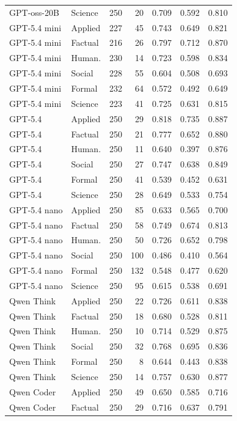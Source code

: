 \begin{longtable}{llrrrrr}
GPT-oss-20B & Science & 250 & 20 & 0.709 & 0.592 & 0.810 \\
GPT-5.4 mini & Applied & 227 & 45 & 0.743 & 0.649 & 0.821 \\
GPT-5.4 mini & Factual & 216 & 26 & 0.797 & 0.712 & 0.870 \\
GPT-5.4 mini & Human. & 230 & 14 & 0.723 & 0.598 & 0.834 \\
GPT-5.4 mini & Social & 228 & 55 & 0.604 & 0.508 & 0.693 \\
GPT-5.4 mini & Formal & 232 & 64 & 0.572 & 0.492 & 0.649 \\
GPT-5.4 mini & Science & 223 & 41 & 0.725 & 0.631 & 0.815 \\
GPT-5.4 & Applied & 250 & 29 & 0.818 & 0.735 & 0.887 \\
GPT-5.4 & Factual & 250 & 21 & 0.777 & 0.652 & 0.880 \\
GPT-5.4 & Human. & 250 & 11 & 0.640 & 0.397 & 0.876 \\
GPT-5.4 & Social & 250 & 27 & 0.747 & 0.638 & 0.849 \\
GPT-5.4 & Formal & 250 & 41 & 0.539 & 0.452 & 0.631 \\
GPT-5.4 & Science & 250 & 28 & 0.649 & 0.533 & 0.754 \\
GPT-5.4 nano & Applied & 250 & 85 & 0.633 & 0.565 & 0.700 \\
GPT-5.4 nano & Factual & 250 & 58 & 0.749 & 0.674 & 0.813 \\
GPT-5.4 nano & Human. & 250 & 50 & 0.726 & 0.652 & 0.798 \\
GPT-5.4 nano & Social & 250 & 100 & 0.486 & 0.410 & 0.564 \\
GPT-5.4 nano & Formal & 250 & 132 & 0.548 & 0.477 & 0.620 \\
GPT-5.4 nano & Science & 250 & 95 & 0.615 & 0.538 & 0.691 \\
Qwen Think & Applied & 250 & 22 & 0.726 & 0.611 & 0.838 \\
Qwen Think & Factual & 250 & 18 & 0.680 & 0.528 & 0.811 \\
Qwen Think & Human. & 250 & 10 & 0.714 & 0.529 & 0.875 \\
Qwen Think & Social & 250 & 32 & 0.768 & 0.695 & 0.836 \\
Qwen Think & Formal & 250 & 8 & 0.644 & 0.443 & 0.838 \\
Qwen Think & Science & 250 & 14 & 0.757 & 0.630 & 0.877 \\
Qwen Coder & Applied & 250 & 49 & 0.650 & 0.585 & 0.716 \\
Qwen Coder & Factual & 250 & 29 & 0.716 & 0.637 & 0.791 \\

\end{longtable}

